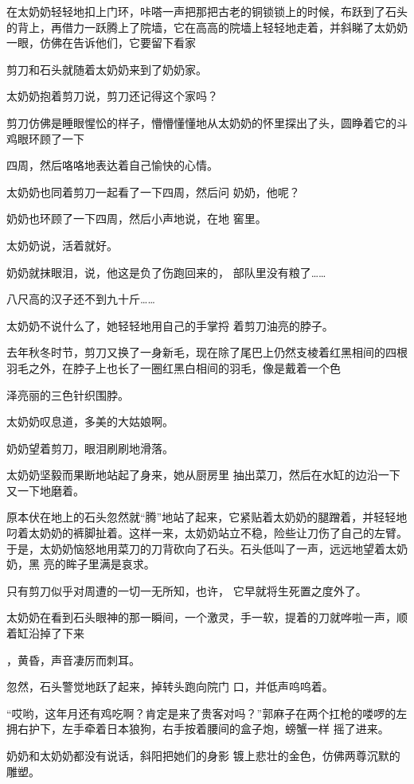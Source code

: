 \documentclass{article}
\begin{document}
在太奶奶轻轻地扣上门环，咔嗒一声把那把古老的铜锁锁上的时候，布跃到了石头的背上，再借力一跃腾上了院墙，它在高高的院墙上轻轻地走着，并斜睇了太奶奶一眼，仿佛在告诉他们，它要留下看家


剪刀和石头就随着太奶奶来到了奶奶家。 


太奶奶抱着剪刀说，剪刀还记得这个家吗？ 

剪刀仿佛是睡眼惺忪的样子，懵懵懂懂地从太奶奶的怀里探出了头，圆睁着它的斗鸡眼环顾了一下
\newpage

四周，然后咯咯地表达着自己愉快的心情。 

太奶奶也同着剪刀一起看了一下四周，然后问
奶奶，他呢？ 

奶奶也环顾了一下四周，然后小声地说，在地
窖里。 


太奶奶说，活着就好。 

奶奶就抹眼泪，说，他这是负了伤跑回来的，
部队里没有粮了…… 


八尺高的汉子还不到九十斤…… 

太奶奶不说什么了，她轻轻地用自己的手掌捋
着剪刀油亮的脖子。 

去年秋冬时节，剪刀又换了一身新毛，现在除了尾巴上仍然支棱着红黑相间的四根羽毛之外，在脖子上也长了一圈红黑白相间的羽毛，像是戴着一个色
\newpage

泽亮丽的三色针织围脖。 


太奶奶叹息道，多美的大姑娘啊。 


奶奶望着剪刀，眼泪刷刷地滑落。 

太奶奶坚毅而果断地站起了身来，她从厨房里
抽出菜刀，然后在水缸的边沿一下又一下地磨着。 

原本伏在地上的石头忽然就“腾”地站了起来，它紧贴着太奶奶的腿蹭着，并轻轻地叼着太奶奶的裤脚扯着。这样一来，太奶奶站立不稳，险些让刀伤了自己的左臂。于是，太奶奶恼怒地用菜刀的刀背砍向了石头。石头低叫了一声，远远地望着太奶奶，黑
亮的眸子里满是哀求。 

只有剪刀似乎对周遭的一切一无所知，也许，
它早就将生死置之度外了。 

太奶奶在看到石头眼神的那一瞬间，一个激灵，手一软，提着的刀就哗啦一声，顺着缸沿掉了下来
\newpage

，黄昏，声音凄厉而刺耳。 

忽然，石头警觉地跃了起来，掉转头跑向院门
口，并低声呜呜着。 

“哎哟，这年月还有鸡吃啊？肯定是来了贵客对吗？”郭麻子在两个扛枪的喽啰的左拥右护下，左手牵着日本狼狗，右手按着腰间的盒子炮，螃蟹一样
摇了进来。 

奶奶和太奶奶都没有说话，斜阳把她们的身影
镀上悲壮的金色，仿佛两尊沉默的雕塑。 
\end{document}
